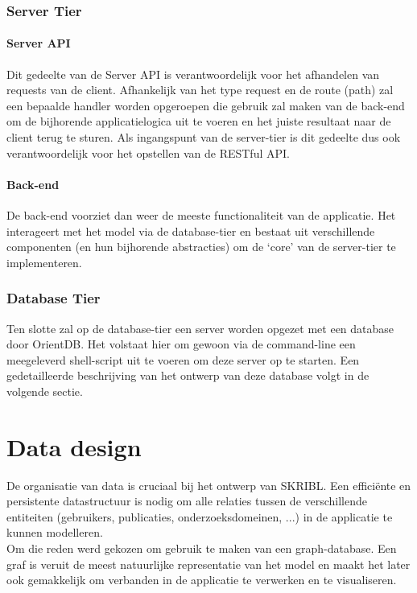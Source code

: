 \documentclass{article}
\begin{document}
\subsubsection{Server Tier}

\paragraph{Server API} 
Dit gedeelte van de Server API is verantwoordelijk voor het afhandelen van requests van de client. Afhankelijk van het type request en de route (path) zal een bepaalde handler worden opgeroepen die gebruik zal maken van de back-end om de bijhorende applicatielogica uit te voeren en het juiste resultaat naar de client terug te sturen. Als ingangspunt van de server-tier is dit gedeelte dus ook verantwoordelijk voor het opstellen van de RESTful API.

\paragraph{Back-end} 
De back-end voorziet dan weer de meeste functionaliteit van de applicatie. Het interageert met het model via de database-tier en bestaat uit verschillende componenten (en hun bijhorende abstracties) om de `core' van de server-tier te implementeren.

\subsubsection{Database Tier}

Ten slotte zal op de database-tier een server worden opgezet met een database door OrientDB. Het volstaat hier om gewoon via de command-line een meegeleverd shell-script uit te voeren om deze server op te starten.
Een gedetailleerde beschrijving van het ontwerp van deze database volgt in de volgende sectie. 

\clearpage

\section{Data design}

De organisatie van data is cruciaal bij het ontwerp van SKRIBL. Een effici\"ente en persistente datastructuur is nodig om alle relaties tussen de verschillende entiteiten (gebruikers, publicaties, onderzoeksdomeinen, ...) in de applicatie te kunnen modelleren. \\

Om die reden werd gekozen om gebruik te maken van een graph-database. Een graf is veruit de meest natuurlijke representatie van het model en maakt het later ook gemakkelijk om verbanden in de applicatie te verwerken en te visualiseren. 
\end{document}
